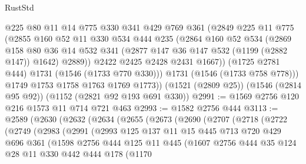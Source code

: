 \begin{lexlean}{RustStd}
\begin{coremodule}
            @225
            @80
            @11
            @14
            @775
            @330
            @341
            @429
            @769
            @361
            (@2849
              @225
              @11
              @775
              (@2855
                @160
                @52
                @11
                @330
                @534
                @444
                @235
                (@2864
                  @160
                  @52
                  @534
                  (@2869
                    @158
                    @80
                    @36
                    @14
                    @532
                    @341
                    (@2877 @147 @36 @147 @532 (@1199 (@2882 @147)) @1642)
                    @2889))
                @2422
                @2425
                @2428
                @2431
                @1667))
            (@1725 @2781 @444)
            @1731
            (@1546 (@1733 @770 @330)))
          @1731
          (@1546 (@1733 @758 @778)))
        @1749
        @1753
        @1758
        @1763
        @1769
        @1773))
    (@1521 (@2809 @25))
    (@1546 (@2814 @95 @92))
    (@1152 (@2821 @92 @193 @691 @330))
@2991 := @1569 @2756 @120 @216 @1573 @11 @714 @721 @463
@2993 := @1582 @2756 @444
@3113 := @2589
    (@2630
      (@2632
        (@2634
          (@2655
            (@2673
              (@2690
                (@2707
                  (@2718
                    (@2722
                      (@2749
                        (@2983
                          (@2991
                            (@2993
                              @125
                              @137
                              @11
                              @15
                              @445
                              @713
                              @720
                              @429
                              @696
                              @361
                              (@1598
                                @2756
                                @444
                                @125
                                @11
                                @445
                                (@1607
                                  @2756
                                  @444
                                  @35
                                  @124
                                  @28
                                  @11
                                  @330
                                  @442
                                  @444
                                  @178
                                  (@1170

\end{coremodule}
\end{lexlean}
